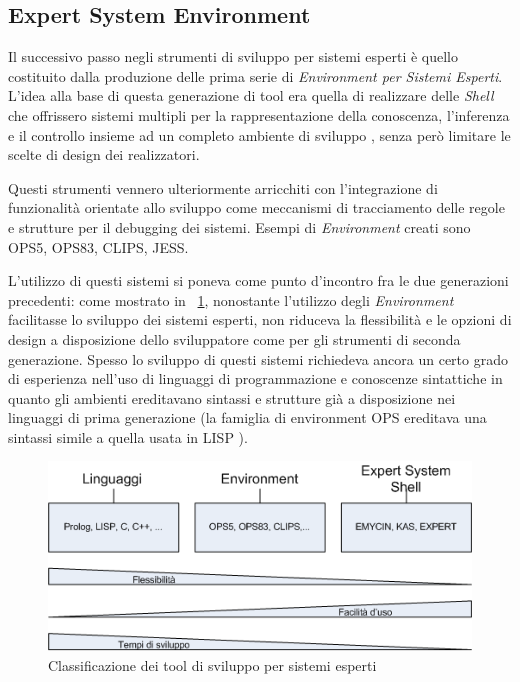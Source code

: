 \subsection{Expert System Environment}

Il successivo passo negli strumenti di sviluppo per sistemi esperti è quello costituito dalla produzione delle prima serie di \emph{Environment per Sistemi Esperti}. L'idea alla base di questa generazione di tool era quella di realizzare delle \emph{Shell} che offrissero sistemi multipli per la rappresentazione della conoscenza, l'inferenza e il controllo insieme ad un completo ambiente di sviluppo \cite{development1993}, senza però limitare le scelte di design dei realizzatori.

Questi strumenti vennero ulteriormente arricchiti con l'integrazione di funzionalità orientate allo sviluppo come meccanismi di tracciamento delle regole e strutture per il debugging dei sistemi. Esempi di \emph{Environment} creati sono OPS5, OPS83, CLIPS, JESS.

L'utilizzo di questi sistemi si poneva come punto d'incontro fra le due generazioni precedenti: come mostrato in \figurename~\ref{fig:classificazione-tools}, nonostante l'utilizzo degli \emph{Environment} facilitasse lo sviluppo dei sistemi esperti, non riduceva la flessibilità e le opzioni di design a disposizione dello sviluppatore come per gli strumenti di seconda generazione. Spesso lo sviluppo di questi sistemi richiedeva ancora un certo grado di esperienza nell'uso di linguaggi di programmazione e conoscenze sintattiche in quanto gli ambienti ereditavano sintassi e strutture già a disposizione nei linguaggi di prima generazione (la famiglia di environment OPS ereditava una sintassi simile a quella usata in LISP \cite{brownston1985}).

\begin{figure}
\centering
\includegraphics[scale=0.7]{Immagini/Capitolo1/classificazione-strumenti.png}
\caption{Classificazione dei tool di sviluppo per sistemi esperti}\label{fig:classificazione-tools}
\end{figure}

